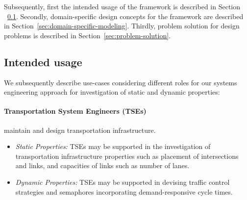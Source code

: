 \documentclass[a4paper,twoside]{article}
\begin{document}
	
	Subsequently, first the intended usage of the framework is described in Section ~\ref{sec:scope}.
	Secondly, domain-specific design concepts for the framework are described in Section~\ref{sec:domain-specific-modeling}.
	Thirdly, problem solution for design problems is described in Section~\ref{sec:problem-solution}.
	
	\subsection{Intended usage}
	\label{sec:scope}
	
We subsequently describe use-cases considering different roles
for our systems engineering approach for investigation of static and dynamic properties:

\paragraph{Transportation System Engineers (TSEs)} maintain and design transportation infrastructure.
\begin{itemize}
	\item \textit{Static Properties:} %
	TSEs may be supported in the investigation of transportation infrastructure properties such as placement of intersections and links, and capacities of links such as number of lanes.
	\item \textit{Dynamic Properties:} %
	TSEs may be supported in devising traffic control strategies and semaphores incorporating demand-responsive cycle times.
\end{itemize}
	
\end{document}
